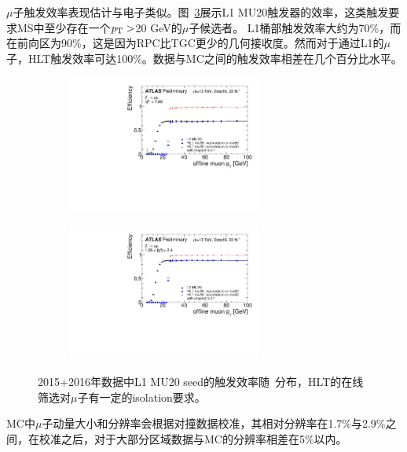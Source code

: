 $\mu$子触发效率\cite{Muon-trigger-results}表现估计与电子类似。图~\ref{fig:muon_trigger_eff}展示L1 MU20触发器的效率，这类触发要求MS中至少存在一个$p_{\text{T}}>$20 GeV的$\mu$子候选者。
L1桶部触发效率大约为70\%，而在前向区为90\%，这是因为RPC比TGC更少的几何接收度。然而对于通过L1的$\mu$子，HLT触发效率可达100\%。数据与MC之间的触发效率相差在几个百分比水平。
\begin{figure}[h]
\begin{center}
\begin{subfigure}[b]{0.45\textwidth}
\centering
      \includegraphics[width=0.7\textwidth,angle=-90]{fig/HLT_mu26_ivarmedium_OR_HLT_mu50_Medium_IsoFixedCutTightTrackOnly_barrel_probe_pt_eff.pdf}
     \caption{}
      \label{fig:muon_trigger_eff_pt_barrel}
  \end{subfigure}
 \begin{subfigure}[b]{0.45\textwidth}
 \centering
      \includegraphics[width=0.7\textwidth,angle=-90]{fig/HLT_mu26_ivarmedium_OR_HLT_mu50_Medium_IsoFixedCutTightTrackOnly_endcap_probe_pt_eff.pdf}
      \caption{}
      \label{fig:muon_trigger_eff_pt_endcap}
  \end{subfigure}
\caption{2015+2016年数据中L1 MU20 seed的触发效率随\pT~分布\cite{Muon-trigger-results}，HLT的在线筛选对$\mu$子有一定的isolation要求。}
 \label{fig:muon_trigger_eff}
\end{center}
\end{figure}
MC中$\mu$子动量大小和分辨率会根据对撞数据校准\cite{Aad2016-mu2016}，其相对分辨率在1.7\%与2.9\%之间，在校准之后，对于大部分\abseta 区域数据与MC的分辨率相差在5\%以内。

